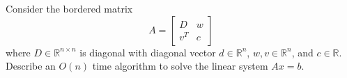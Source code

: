 \documentclass[12pt, leqno]{article}
\begin{document}

Consider the bordered matrix
\[
  A = \begin{bmatrix} D & w \\ v^T & c \end{bmatrix}
\]
where $D \in \mathbb{R}^{n \times n}$ is diagonal with diagonal 
vector $d \in \mathbb{R}^n$, $w, v \in \mathbb{R}^n$, and $c \in \mathbb{R}$.
Describe an $O(n)$ time algorithm to solve the linear system $Ax = b$.
\end{document}
